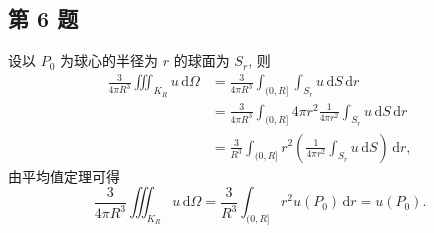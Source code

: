 \documentclass[\ROOT/main.tex]{subfiles}
\begin{document}
\subsection{第 6 题}
设以 $P_0$ 为球心的半径为 $r$ 的球面为 $S_r$, 则
\begin{align*}
    \frac{3}{4 \pi R^3} \iiint_{K_R} u \, \mathrm{d} \Omega
    &= \frac{3}{4 \pi R^3} \int_{(0, R]} \int_{S_r} u \, \mathrm{d}S \, \mathrm{d}r \\
    &= \frac{3}{4 \pi R^3} \int_{(0, R]} 4 \pi r^2 \frac{1}{4 \pi r^2} \int_{S_r} u \, \mathrm{d}S \, \mathrm{d}r \\
    &= \frac{3}{R^3} \int_{(0, R]} r^2 \left( \frac{1}{4 \pi r^2} \int_{S_r} u \, \mathrm{d}S \right)  \, \mathrm{d}r
    ,
\end{align*}
由平均值定理可得
\[
    \frac{3}{4 \pi R^3} \iiint_{K_R} u \, \mathrm{d} \Omega
    = \frac{3}{R^3} \int_{(0, R]} r^2 u \left( P_0 \right) \, \mathrm{d}r
    = u \left( P_0 \right). 
\]
\end{document}
